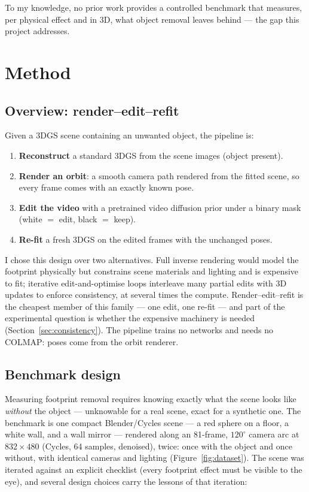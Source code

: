 \documentclass[11pt]{article}
\begin{document}
To my knowledge, no prior work provides a controlled benchmark that measures, per physical effect and in 3D, what object removal leaves behind --- the gap this project addresses.

\section{Method}
\label{sec:method}

\subsection{Overview: render--edit--refit}
Given a 3DGS scene containing an unwanted object, the pipeline is:
\begin{enumerate}
  \item \textbf{Reconstruct} a standard 3DGS from the scene images (object present).
  \item \textbf{Render an orbit}: a smooth camera path rendered from the fitted scene, so every frame comes with an exactly known pose.
  \item \textbf{Edit the video} with a pretrained video diffusion prior under a binary mask (white $=$ edit, black $=$ keep).
  \item \textbf{Re-fit} a fresh 3DGS on the edited frames with the unchanged poses.
\end{enumerate}
I chose this design over two alternatives. Full inverse rendering \cite{irgs} would model the footprint physically but constrains scene materials and lighting and is expensive to fit; iterative edit-and-optimise loops \cite{in2n,igs2gs} interleave many partial edits with 3D updates to enforce consistency, at several times the compute. Render--edit--refit is the cheapest member of this family --- one edit, one re-fit --- and part of the experimental question is whether the expensive machinery is needed (Section~\ref{sec:consistency}). The pipeline trains no networks and needs no COLMAP: poses come from the orbit renderer.

\subsection{Benchmark design}
\label{sec:benchmark}
Measuring footprint removal requires knowing exactly what the scene looks like \emph{without} the object --- unknowable for a real scene, exact for a synthetic one. The benchmark is one compact Blender/Cycles scene --- a red sphere on a floor, a white wall, and a wall mirror --- rendered along an 81-frame, $120^\circ$ camera arc at $832{\times}480$ (Cycles, 64 samples, denoised), twice: once with the object and once without, with identical cameras and lighting (Figure~\ref{fig:dataset}). The scene was iterated against an explicit checklist (every footprint effect must be visible to the eye), and several design choices carry the lessons of that iteration:
\end{document}

